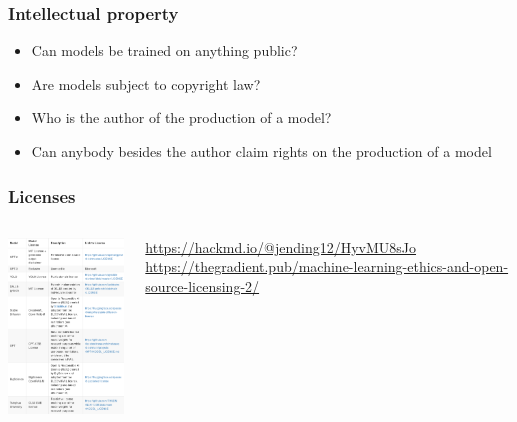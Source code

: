 \documentclass[17pt,aspectratio=169,hyperref={pdfusetitle,colorlinks,allcolors=olive}]{beamer}
\begin{document}
\begin{frame}[fragile]
  \frametitle{Intellectual property}

  \begin{itemize}
  \item Can models be trained on anything public?

  \item Are models subject to copyright law?

  \item Who is the author of the production of a model?

  \item Can anybody besides the author claim rights on the production of a model
  \end{itemize}
  
\end{frame}

\begin{frame}[fragile]
  \frametitle{Licenses}

  \begin{columns}[T]
    \begin{column}{.36\textwidth}
        \includegraphics[width=4cm]{figs/licensing}
    \end{column}%
    \hfill%
    \begin{column}{.62\textwidth}

        \vspace{0.5cm}
        
        {\scriptsize
          \url{https://hackmd.io/@jending12/HyvMU8sJo} \\

          \vspace{1.5cm}
          \url{https://thegradient.pub/machine-learning-ethics-and-open-source-licensing-2/}
        }
    \end{column}%
  \end{columns}
  
\end{frame}
\end{document}
